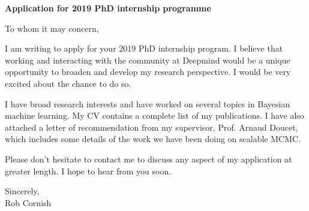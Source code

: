 \documentclass[12pt,a4paper]{letter}
\begin{document}

\begin{letter}{\bf Application for 2019 PhD internship programme}
\opening{}

To whom it may concern,

\bigskip
I am writing to apply for your 2019 PhD internship program. I believe that working and
interacting with the community at Deepmind would be a unique opportunity to broaden and
develop my research perspective. I would be very excited about the chance to do so.

\bigskip
I have broad research interests and have worked on several topics in Bayesian machine
learning. My CV contains a complete list of my publications. I have also attached a letter
of recommendation from my supervisor, Prof. Arnaud Doucet, which includes some details of
the work we have been doing on scalable MCMC.

\bigskip
Please don't hesitate to contact me to discuss any aspect of my application at greater
length. I hope to hear from you soon.

\closing{
Sincerely,\\
\bigskip
Rob Cornish
}

\end{letter}
\end{document}
